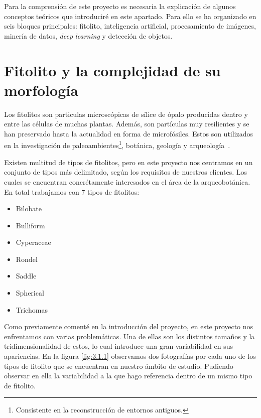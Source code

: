 

Para la comprensión de este proyecto es necesaria la explicación de algunos conceptos teóricos que introduciré en este apartado. Para ello se ha organizado en seis bloques principales: fitolito, inteligencia artificial, procesamiento de imágenes, minería de datos, \textit{deep learning} y detección de objetos.

\section{Fitolito y la complejidad de su morfología}

Los fitolitos son particulas microscópicas de sílice de ópalo producidas dentro y entre las células de muchas plantas. Además, son partículas muy resilientes y se han preservado hasta la actualidad en forma de microfósiles. Estos son utilizados en la investigación de paleoambientes\footnote{Consistente en la reconstrucción de entornos antiguos.}, botánica, geología y arqueología~\cite{phytolith}.

Existen multitud de tipos de fitolitos, pero en este proyecto nos centramos en un conjunto de tipos más delimitado, según los requisitos de nuestros clientes. Los cuales se encuentran concrétamente interesados en el área de la arqueobotánica. En total trabajamos con 7 tipos de fitolitos:

\begin{multicols}{2}
	\begin{itemize}
		\item Bilobate
		\item Bulliform
		\item Cyperaceae
		\item Rondel
		\item Saddle
		\item Spherical
		\item Trichomas
	\end{itemize}
\end{multicols}

Como previamente comenté en la introducción del proyecto, en este proyecto nos enfrentamos con varias problemáticas. Una de ellas son los distintos tamaños y la tridimensionalidad de estos, lo cual introduce una gran variabilidad en sus apariencias. En la figura \ref{fig:3.1.1} observamos dos fotografías por cada uno de los tipos de fitolito que se encuentran en nuestro ámbito de estudio. Pudiendo observar en ella la variabilidad a la que hago referencia dentro de un mismo tipo de fitolito.

